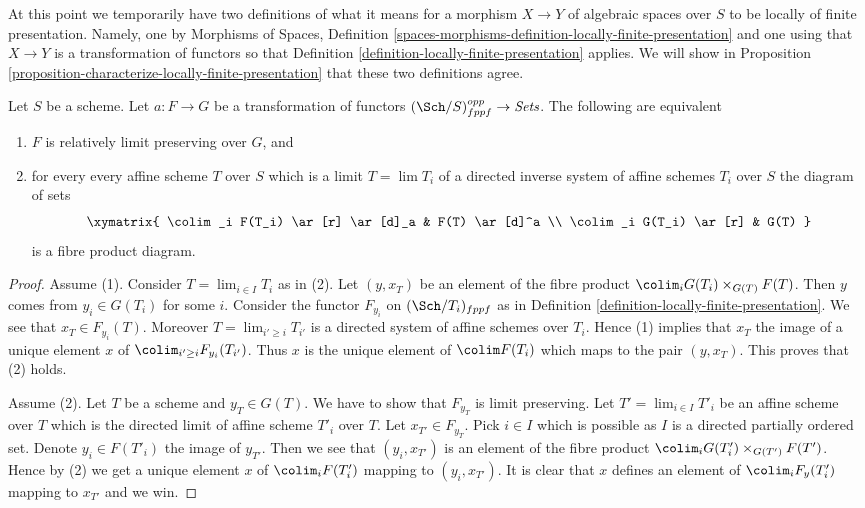 \medskip\noindent
At this point we temporarily have two definitions of what it means
for a morphism $X \to Y$ of algebraic spaces over $S$ to be locally of finite
presentation. Namely, one by
Morphisms of Spaces,
Definition \ref{spaces-morphisms-definition-locally-finite-presentation}
and one using that $X \to Y$ is a transformation of functors so that
Definition \ref{definition-locally-finite-presentation}
applies. We will show in
Proposition \ref{proposition-characterize-locally-finite-presentation}
that these two definitions agree.

\begin{lemma}
\label{lemma-characterize-relative-limit-preserving}
Let $S$ be a scheme. Let $a : F \to G$ be a transformation of functors
$(\Sch/S)_{fppf}^{opp} \to \textit{Sets}$.
The following are equivalent
\begin{enumerate}
\item $F$ is relatively limit preserving over $G$, and
\item for every every affine scheme $T$ over $S$ which is a
limit $T = \lim T_i$ of a directed inverse system of affine
schemes $T_i$ over $S$ the diagram of sets
$$
\xymatrix{
\colim_i F(T_i) \ar[r] \ar[d]_a & F(T) \ar[d]^a \\
\colim_i G(T_i) \ar[r] & G(T)
}
$$
is a fibre product diagram.
\end{enumerate}
\end{lemma}

\begin{proof}
Assume (1). Consider $T = \lim_{i \in I} T_i$ as in (2). Let
$(y, x_T)$ be an element of the fibre product
$\colim_i G(T_i) \times_{G(T)} F(T)$.
Then $y$ comes from $y_i \in G(T_i)$ for some $i$.
Consider the functor $F_{y_i}$ on $(\Sch/T_i)_{fppf}$ as in
Definition \ref{definition-locally-finite-presentation}.
We see that $x_T \in F_{y_i}(T)$. Moreover $T = \lim_{i' \geq i} T_{i'}$
is a directed system of affine schemes over $T_i$. Hence (1) implies
that $x_T$ the image of a unique element $x$ of
$\colim_{i' \geq i} F_{y_i}(T_{i'})$. Thus $x$ is the unique
element of $\colim F(T_i)$ which maps to the pair $(y, x_T)$.
This proves that (2) holds.

\medskip\noindent
Assume (2). Let $T$ be a scheme and $y_T \in G(T)$. We have to show that
$F_{y_T}$ is limit preserving. Let $T' = \lim_{i \in I} T'_i$ be an
affine scheme over $T$ which is the directed limit of affine scheme $T'_i$
over $T$. Let $x_{T'} \in F_{y_T}$. Pick $i \in I$ which is possible as
$I$ is a directed partially ordered set. Denote $y_i \in F(T'_i)$ the
image of $y_{T'}$. Then we see that $(y_i, x_{T'})$ is an
element of the fibre product
$\colim_i G(T'_i) \times_{G(T')} F(T')$.
Hence by (2) we get a unique element $x$ of $\colim_i F(T'_i)$
mapping to $(y_i, x_{T'})$. It is clear that $x$ defines an element
of $\colim_i F_y(T'_i)$ mapping to $x_{T'}$ and we win.
\end{proof}


